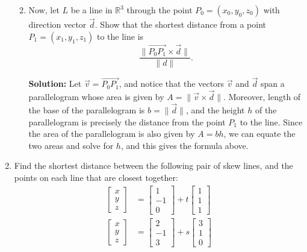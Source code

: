\documentclass[letterpaper,12pt]{article}
\newcommand{\len}[1]{\lVert #1\rVert}
\newcommand{\R}{\mathbb{R}}
\begin{document}
\begin{enumerate}
\begin{enumerate}
\bigskip

       \item Now, let $L$ be a line in $\R^3$ through the point $P_0=(x_0,y_0,z_0)$ with direction vector $\vec{d}$. Show that the shortest distance from a point $P_1=(x_1,y_1,z_1)$ to the line is
\[
 \frac{\len{\overrightarrow{P_0P_1}\times \vec{d}}}{\len{d}}.
\]

\bigskip

{\bf Solution:} Let $\vec{v} = \overrightarrow{P_0P_1}$, and notice that the vectors $\vec{v}$ and $\vec{d}$ span a parallelogram whose area is given by $A = \len{\vec{v}\times\vec{d}}$. Moreover, length of the base of the parallelogram is $b = \len{\vec{d}}$, and the height $h$ of the parallelogram is precisely the distance from the point $P_1$ to the line. Since the area of the parallelogram is also given by $A=bh$, we can equate the two areas and solve for $h$, and this gives the formula above.

\bigskip

      \end{enumerate}
\item Find the shortest distance between the following pair of skew lines, and the points on each line that are closest together:
\begin{align*}
        \begin{bmatrix}x\\y\\z\end{bmatrix} & = \begin{bmatrix}1\\-1\\0\end{bmatrix}+t\begin{bmatrix}1\\1\\1\end{bmatrix}\\
        \begin{bmatrix}x\\y\\z\end{bmatrix} & = \begin{bmatrix}2\\-1\\3\end{bmatrix}+s\begin{bmatrix}3\\1\\0\end{bmatrix}\\
       \end{align*}


\end{enumerate}
\end{document}
